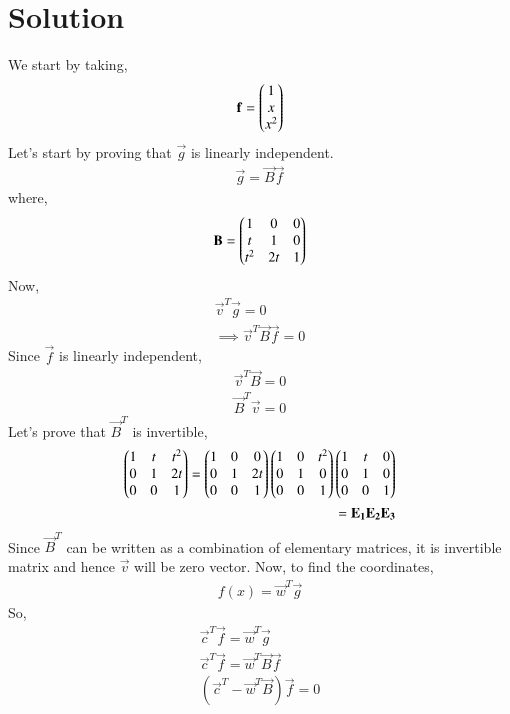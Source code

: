 \documentclass[journal,12pt,twocolumn]{IEEEtran}
\begin{document}
   \section{\textbf{Solution}}
   We start by taking,\begin{align}\mathbf{f}=\begin{pmatrix}1\\x\\x^2\end{pmatrix}\end{align}
   Let's start by proving that $\vec{g}$ is linearly independent.
    \begin{align}
    \vec{g}=\vec{B}\vec{f}
    \end{align}
    where,
    \begin{align}
    \mathbf{B}=\begin{pmatrix}1&0&0\\t&1&0\\t^2&2t&1\end{pmatrix}
    \end{align}
    Now,
    \begin{align}
    \vec{v}^T\vec{g}=0\\
    \implies \vec{v}^T\vec{B}\vec{f}=0
    \end{align}
    Since $\vec{f}$ is linearly independent,
    \begin{align}
     \vec{v}^T\vec{B}=0\\
     \vec{B}^T\vec{v}=0
    \end{align}
   Let's prove that $\vec{B}^T$ is invertible,
   \begin{align}
   \begin{pmatrix}1&t&t^2\\0&1&2t\\0&0&1\end{pmatrix}=\begin{pmatrix}1&0&0\\0&1&2t\\0&0&1\end{pmatrix}\begin{pmatrix}1&0&t^2\\0&1&0\\0&0&1\end{pmatrix}\begin{pmatrix}1&t&0\\0&1&0\\0&0&1\end{pmatrix}\\
   =\mathbf{E_1}\mathbf{E_2}\mathbf{E_3}
   \end{align}
   Since $\vec{B}^T$ can be written as a combination of elementary matrices, it is invertible matrix and hence $\vec{v}$ will be zero vector.
   Now, to find the coordinates,
  \begin{align}
  f(x)=\vec{w}^T\vec{g}
  \end{align}
  So,
  \begin{align}
  \vec{c}^T\vec{f}=\vec{w}^T\vec{g}\\
\vec{c}^T\vec{f}=\vec{w}^T\vec{B}\vec{f}\\
(\vec{c}^T-\vec{w}^T\vec{B})\vec{f}=0
  \end{align} 
\end{document}
